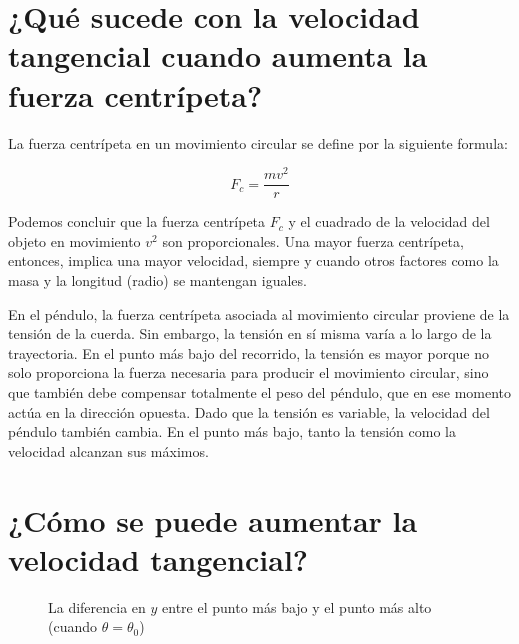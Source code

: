 \documentclass[letterpaper]{report}
\numberwithin{table}{section}
\begin{document}
\section*{¿Qué sucede con la velocidad tangencial cuando
aumenta la fuerza centrípeta?}\label{sec:velocidad_tangencial}

La fuerza centrípeta en un movimiento circular se define por la
siguiente formula:

\begin{equation}
  F_{c} = \frac{mv^{2}}{r}
\end{equation}

Podemos concluir que la fuerza centrípeta $F_{c}$ y el cuadrado de la
velocidad del objeto en movimiento $v^{2}$ son proporcionales. Una
mayor fuerza centrípeta, entonces, implica una mayor velocidad,
siempre y cuando otros factores como la masa y la longitud (radio) se
mantengan iguales.

En el péndulo, la fuerza centrípeta asociada al movimiento circular
proviene de la tensión de la cuerda. Sin embargo, la tensión en sí
misma varía a lo largo de la trayectoria. En el punto más bajo del
recorrido, la tensión es mayor porque no solo proporciona la fuerza
necesaria para producir el movimiento circular, sino que también debe
compensar totalmente el peso del péndulo, que en ese momento actúa en
la dirección opuesta. Dado que la tensión es variable, la velocidad
del péndulo también cambia. En el punto más bajo, tanto la tensión
como la velocidad alcanzan sus máximos.

\section*{¿Cómo se puede aumentar la velocidad tangencial?}

\begin{figure}[h!]
  \centering
  \caption{La diferencia en $y$ entre el punto más bajo y el punto más alto
  (cuando $\theta = \theta_{0}$)}\label{fig:angled_line}
\end{figure}
\end{document}

